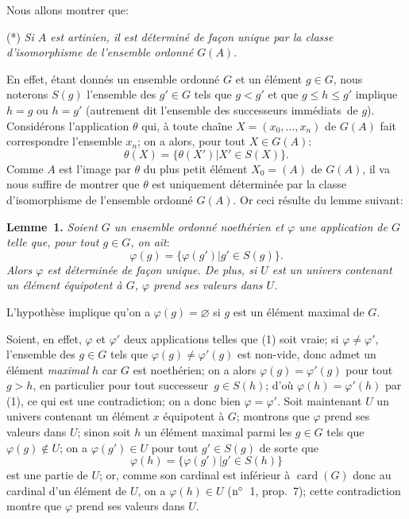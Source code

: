\documentclass[12pt]{article}
\newcommand{\nn}{\noindent}
\newcommand{\card}{\operatorname{card}}
\begin{document}
Nous allons montrer que:

(*) \emph{Si $A$ est artinien, il est déterminé de façon unique par la classe d'isomorphisme de l'ensemble ordonné $G(A)$.}

En effet, étant donnés un ensemble ordonné $G$ et un élément $g\in G$, nous noterons $S(g)$ l'ensemble des $g'\in G$ tels que $g < g'$ et que $g\leq h\leq g'$ implique $h=g$ ou $h=g'$ (autrement dit l'ensemble des \og successeurs immédiats\fg\ de $g$). Considérons l'application $\theta$ qui, à toute chaîne $X=(x_0,\ldots,x_n)$ de $G(A)$ fait correspondre l'ensemble $x_n$; on a alors, pour tout $X\in G(A)$:
$$
\theta(X)=\{\theta(X')| X'\in S(X)\}.
$$
Comme $A$ est l'image par $\theta$ du plus petit élément $X_0=(A)$ de $G(A)$, il va nous suffire de montrer que $\theta$ est uniquement déterminée par la classe d'isomorphisme de l'ensemble ordonné $G(A)$. Or ceci résulte du lemme suivant:

\nn\textbf{Lemme~1.} \emph{Soient $G$ un ensemble ordonné noethérien et $\varphi$ une application de $G$ telle que, pour tout $g\in G$, on ait}:
\begin{equation*}
\varphi(g)=\{\varphi(g')| g'\in S(g)\}.\tag{1}
\end{equation*}
\emph{Alors $\varphi$ est déterminée de façon unique. De plus, si $U$ est un univers contenant un élément équipotent à $G$, $\varphi$ prend ses valeurs dans $U$.}

L'hypothèse implique qu'on a $\varphi(g)=\varnothing$ si $g$ est un élément maximal de $G$.

Soient, en effet, $\varphi$ et $\varphi'$ deux applications telles que (1) soit vraie; si $\varphi\neq\varphi'$, l'ensemble des $g\in G$ tels que $\varphi(g)\neq\varphi'(g)$ est non-vide, donc admet un élément \emph{maximal} $h$ car $G$ est noethérien; on a alors $\varphi(g)=\varphi'(g)$ pour tout $g>h$, en particulier pour tout \og successeur\fg\ $g\in S(h)$; d'où $\varphi(h)=\varphi'(h)$ par (1), ce qui est une contradiction; on a donc bien $\varphi=\varphi'$. Soit maintenant $U$ un univers contenant un élément $x$ équipotent à $G$; montrons que $\varphi$ prend ses valeurs dans $U$; sinon soit $h$ un élément maximal parmi les $g\in G$ tels que $\varphi(g)\not\in U$; on a $\varphi(g')\in U$ pour tout $g'\in S(g)$ de sorte que
$$
\varphi(h)=\{\varphi(g')| g'\in S(h)\}
$$
est une partie de $U$; or, comme son cardinal est inférieur à $\card(G)$ donc au cardinal d'un élément de $U$, on a $\varphi(h)\in U$ ($\rm n^\circ$~1, prop.~7); cette contradiction montre que $\varphi$ prend ses valeurs dans $U$.
\end{document}
